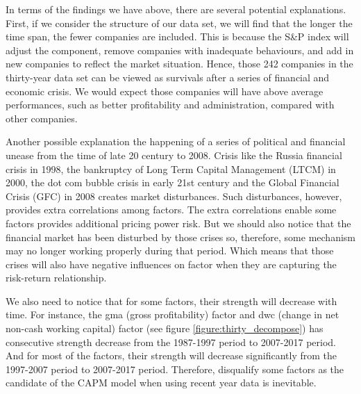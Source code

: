 In terms of the findings we have above, there are several potential explanations.
First, if we consider the structure of our data set, we will find that the longer the time span, the fewer companies are included.
This is because the S\&P index will adjust the component, remove companies with inadequate behaviours, and add in new companies to reflect the market situation.
Hence, those 242 companies in the thirty-year data set can be viewed as survivals after a series of financial and economic crisis.
We would expect those companies will have above average performances, such as better profitability and administration, compared with other companies. 


Another possible explanation the happening of a series of political and financial unease from the time of late 20 century to 2008.
Crisis like the Russia financial crisis in 1998, the bankruptcy of Long Term Capital Management (LTCM) in 2000, the dot com bubble crisis in early 21st century and the Global Financial Crisis (GFC) in 2008 creates market disturbances.
Such disturbances, however, provides extra correlations among factors.
The extra correlations enable some factors provides additional pricing power risk.
But we should also notice that the financial market has been disturbed by those crises so, therefore, some mechanism may no longer working properly during that period.
Which means that those crises will also have negative influences on factor when they are capturing the risk-return relationship.

We also need to notice that for some factors, their strength will decrease with time.
For instance, the gma (gross profitability) factor and dwc (change in net non-cash working capital) factor (see figure \ref{figure:thirty_decompose}) has consecutive strength decrease from the 1987-1997 period to 2007-2017 period.
And for most of the factors, their strength will decrease significantly from the 1997-2007 period to 2007-2017 period.
Therefore, disqualify some factors as the candidate of the CAPM model when using recent year data is inevitable.





